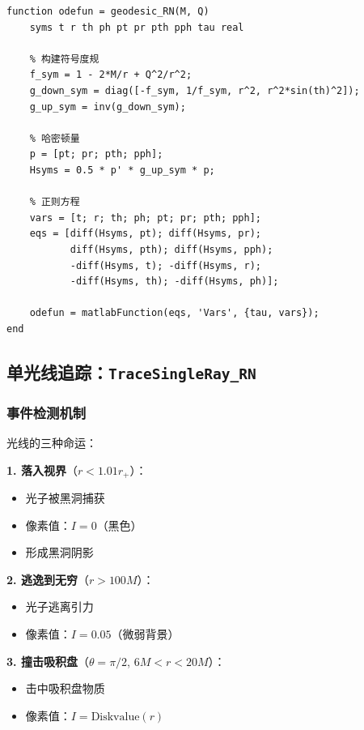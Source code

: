 \documentclass[a4paper,12pt]{article}
\begin{document}
\begin{lstlisting}[caption={测地线方程生成}]
function odefun = geodesic_RN(M, Q)
    syms t r th ph pt pr pth pph tau real
    
    % 构建符号度规
    f_sym = 1 - 2*M/r + Q^2/r^2;
    g_down_sym = diag([-f_sym, 1/f_sym, r^2, r^2*sin(th)^2]);
    g_up_sym = inv(g_down_sym);
    
    % 哈密顿量
    p = [pt; pr; pth; pph];
    Hsyms = 0.5 * p' * g_up_sym * p;
    
    % 正则方程
    vars = [t; r; th; ph; pt; pr; pth; pph];
    eqs = [diff(Hsyms, pt); diff(Hsyms, pr); 
           diff(Hsyms, pth); diff(Hsyms, pph);
           -diff(Hsyms, t); -diff(Hsyms, r); 
           -diff(Hsyms, th); -diff(Hsyms, ph)];
    
    odefun = matlabFunction(eqs, 'Vars', {tau, vars});
end
\end{lstlisting}

\subsection{单光线追踪：\texttt{TraceSingleRay\_RN}}

\subsubsection{事件检测机制}

光线的三种命运：

\textbf{1. 落入视界}（$r < 1.01r_+$）：
\begin{itemize}
    \item 光子被黑洞捕获
    \item 像素值：$I = 0$（黑色）
    \item 形成黑洞阴影
\end{itemize}

\textbf{2. 逃逸到无穷}（$r > 100M$）：
\begin{itemize}
    \item 光子逃离引力
    \item 像素值：$I = 0.05$（微弱背景）
\end{itemize}

\textbf{3. 撞击吸积盘}（$\theta = \pi/2$, $6M < r < 20M$）：
\begin{itemize}
    \item 击中吸积盘物质
    \item 像素值：$I = \text{Diskvalue}(r)$
\end{itemize}
\end{document}
